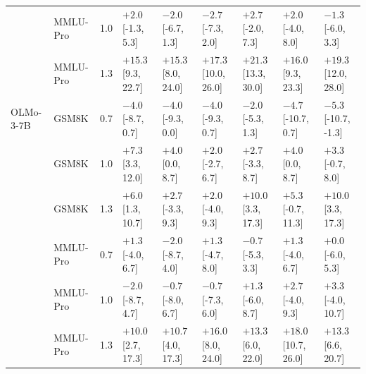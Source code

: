 \begin{tabular}{llcllllll}
 & MMLU-Pro & 1.0 & $+2.0$ [-1.3, 5.3] & $-2.0$ [-6.7, 1.3] & $-2.7$ [-7.3, 2.0] & $+2.7$ [-2.0, 7.3] & $+2.0$ [-4.0, 8.0] & $-1.3$ [-6.0, 3.3] \\
 & MMLU-Pro & 1.3 & $\mathbf{+15.3}$ [9.3, 22.7] & $\mathbf{+15.3}$ [8.0, 24.0] & $\mathbf{+17.3}$ [10.0, 26.0] & $\mathbf{+21.3}$ [13.3, 30.0] & $\mathbf{+16.0}$ [9.3, 23.3] & $\mathbf{+19.3}$ [12.0, 28.0] \\
\midrule
OLMo-3-7B & GSM8K & 0.7 & $-4.0$ [-8.7, 0.7] & $-4.0$ [-9.3, 0.0] & $-4.0$ [-9.3, 0.7] & $-2.0$ [-5.3, 1.3] & $-4.7$ [-10.7, 0.7] & $-5.3$ [-10.7, -1.3] \\
 & GSM8K & 1.0 & $\mathbf{+7.3}$ [3.3, 12.0] & $+4.0$ [0.0, 8.7] & $+2.0$ [-2.7, 6.7] & $+2.7$ [-3.3, 8.7] & $+4.0$ [0.0, 8.7] & $+3.3$ [-0.7, 8.0] \\
 & GSM8K & 1.3 & $\mathbf{+6.0}$ [1.3, 10.7] & $+2.7$ [-3.3, 9.3] & $+2.0$ [-4.0, 9.3] & $\mathbf{+10.0}$ [3.3, 17.3] & $+5.3$ [-0.7, 11.3] & $\mathbf{+10.0}$ [3.3, 17.3] \\
 & MMLU-Pro & 0.7 & $+1.3$ [-4.0, 6.7] & $-2.0$ [-8.7, 4.0] & $+1.3$ [-4.7, 8.0] & $-0.7$ [-5.3, 3.3] & $+1.3$ [-4.0, 6.7] & $+0.0$ [-6.0, 5.3] \\
 & MMLU-Pro & 1.0 & $-2.0$ [-8.7, 4.7] & $-0.7$ [-8.0, 6.7] & $-0.7$ [-7.3, 6.0] & $+1.3$ [-6.0, 8.7] & $+2.7$ [-4.0, 9.3] & $+3.3$ [-4.0, 10.7] \\
 & MMLU-Pro & 1.3 & $\mathbf{+10.0}$ [2.7, 17.3] & $\mathbf{+10.7}$ [4.0, 17.3] & $\mathbf{+16.0}$ [8.0, 24.0] & $\mathbf{+13.3}$ [6.0, 22.0] & $\mathbf{+18.0}$ [10.7, 26.0] & $\mathbf{+13.3}$ [6.6, 20.7] \\
\bottomrule
\end{tabular}
